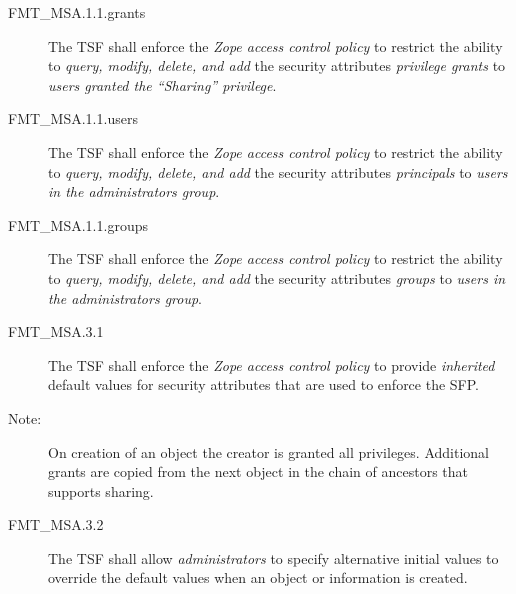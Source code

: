 \documentclass[12pt,english]{scrbook}
\begin{document}




\begin{description}
\item[FMT{\_}MSA.1.1.grants]
    The TSF shall enforce the \emph{Zope access control policy} to restrict the
    ability to \emph{query, modify, delete, and add} the security
    attributes \emph{privilege grants} to \emph{users granted the ``Sharing''
    privilege}.
\item[FMT{\_}MSA.1.1.users]
    The TSF shall enforce the \emph{Zope access control policy} to restrict the
    ability to \emph{query, modify, delete, and add} the security
    attributes \emph{principals} to \emph{users in the administrators
    group}.

\item[FMT{\_}MSA.1.1.groups]
    The TSF shall enforce the \emph{Zope access control policy} to restrict the
    ability to \emph{query, modify, delete, and add} the security
    attributes \emph{groups} to \emph{users in the administrators group}.

\end{description}





\begin{description}

\item[FMT{\_}MSA.3.1]


The TSF shall enforce the \emph{Zope access control policy} to provide 
\emph{inherited} default values for security attributes that are used to 
enforce the SFP. 

\item[Note:] On creation of an object the creator is granted all privileges.
  Additional grants are copied from the next object in the chain of ancestors
  that supports sharing.

\item[FMT{\_}MSA.3.2 ]

The TSF shall allow \emph{administrators} to specify alternative
initial values to override the default values when an object or
information is created.

\end{description}
\end{document}
